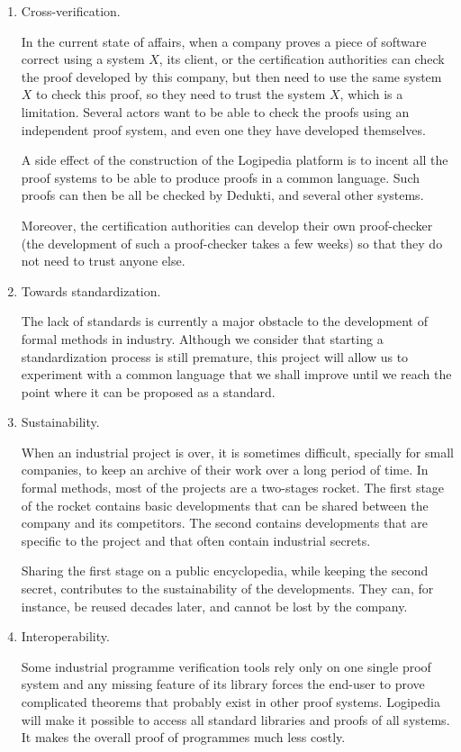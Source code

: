 \begin{enumerate}
\item Cross-verification.

In the current state of affairs, when a company proves a piece of
software correct using a system $X$, its client, or the certification
authorities can check the proof developed by this company, but then
need to use the same system $X$ to check this proof, so they need to
trust the system $X$, which is a limitation. Several actors want to be
able to check the proofs using an independent proof system, and even
one they have developed themselves.

A side effect of the construction of the Logipedia platform is
to incent all the proof systems to be able to produce proofs in a
common language. Such proofs can then be all be checked by
Dedukti, and several other systems.

Moreover, the certification authorities can develop their own
proof-checker (the development of such a proof-checker takes a few
weeks) so that they do not need to trust anyone else.

\item Towards standardization.

The lack of standards is currently a major obstacle to the development
of formal methods in industry. Although we consider that starting a
standardization process is still premature, this project will allow us
to experiment with a common language that we shall improve until we
reach the point where it can be proposed as a standard.

\item Sustainability.

When an industrial project is over, it is sometimes difficult,
specially for small companies, to keep an archive of their work over
a long period of time. In formal methods, most of the projects are a
two-stages rocket. The first stage of the rocket contains basic
developments that can be shared between the company and its
competitors. The second contains developments that are specific to the
project and that often contain industrial secrets.

Sharing the first stage on a public encyclopedia, while keeping the
second secret, contributes to the sustainability of the
developments. They can, for instance, be reused decades later, and
cannot be lost by the company.

\item Interoperability.

  Some industrial programme verification tools rely only on one single
  proof system and any missing feature of its library forces the
  end-user to prove complicated theorems that probably exist in other
  proof systems. Logipedia will make it possible to access all
  standard libraries and proofs of all systems. It makes the overall
  proof of programmes much less costly.


\end{enumerate}
